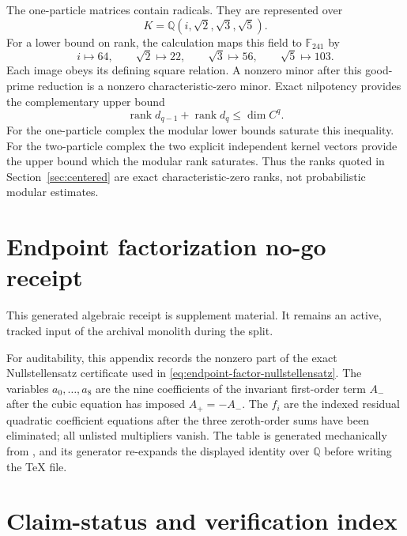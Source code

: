 \documentclass[11pt]{article}
\theoremstyle{definition}
\theoremstyle{remark}
\newcommand{\rank}{\operatorname{rank}}
\begin{document}
The one-particle matrices contain radicals.  They are represented over
\begin{equation}
 K=\mathbb Q(i,\sqrt2,\sqrt3,\sqrt5).
\end{equation}
For a lower bound on rank, the calculation maps this field to
$\mathbb F_{241}$ by
\begin{equation}
 i\mapsto64,
 \qquad \sqrt2\mapsto22,
 \qquad \sqrt3\mapsto56,
 \qquad \sqrt5\mapsto103.
\end{equation}
Each image obeys its defining square relation.  A nonzero minor after this
good-prime reduction is a nonzero characteristic-zero minor.  Exact
nilpotency provides the complementary upper bound
\begin{equation}
 \rank d_{q-1}+\rank d_q\le\dim C^q.
\end{equation}
For the one-particle complex the modular lower bounds saturate this inequality.
For the two-particle complex the two explicit independent kernel vectors
provide the upper bound which the modular rank saturates.  Thus the ranks
quoted in Section~\ref{sec:centered} are exact characteristic-zero ranks,
not probabilistic modular estimates.

\section{Endpoint factorization no-go receipt}
\label{app:endpoint-factorization-receipt}

This generated algebraic receipt is supplement material.  It remains an
active, tracked input of the archival monolith during the split.

For auditability, this appendix records the nonzero part of the exact
Nullstellensatz certificate used in
\eqref{eq:endpoint-factor-nullstellensatz}.  The variables
$a_0,\ldots,a_8$ are the nine coefficients of the invariant first-order
term $A_-$ after the cubic equation has imposed $A_+=-A_-$.  The $f_i$ are
the indexed residual quadratic coefficient equations after the three
zeroth-order sums have been eliminated; all unlisted multipliers vanish.
The table is generated mechanically from
, and its
generator re-expands the displayed identity over $\mathbb Q$ before writing
the TeX file.



\section{Claim-status and verification index}\label{app:verification}
\end{document}
